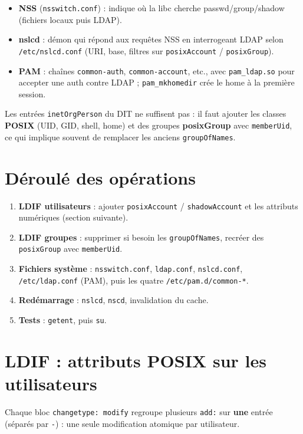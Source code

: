 \documentclass[11pt,a4paper]{report}
\begin{document}
\begin{itemize}[leftmargin=*]
  \item \textbf{NSS} (\texttt{nsswitch.conf}) : indique où la libc cherche passwd/group/shadow (fichiers locaux puis LDAP).
  \item \textbf{nslcd} : démon qui répond aux requêtes NSS en interrogeant LDAP selon \texttt{/etc/nslcd.conf} (URI, base, filtres sur \texttt{posixAccount} / \texttt{posixGroup}).
  \item \textbf{PAM} : chaînes \texttt{common-auth}, \texttt{common-account}, etc., avec \texttt{pam\_ldap.so} pour accepter une auth contre LDAP ; \texttt{pam\_mkhomedir} crée le home à la première session.
\end{itemize}

Les entrées \texttt{inetOrgPerson} du DIT ne suffisent pas : il faut ajouter les classes \textbf{POSIX} (UID, GID, shell, home) et des groupes \textbf{posixGroup} avec \texttt{memberUid}, ce qui implique souvent de remplacer les anciens \texttt{groupOfNames}.

\section{Déroulé des opérations}

\begin{enumerate}[leftmargin=*]
  \item \textbf{LDIF utilisateurs} : ajouter \texttt{posixAccount} / \texttt{shadowAccount} et les attributs numériques (section suivante).
  \item \textbf{LDIF groupes} : supprimer si besoin les \texttt{groupOfNames}, recréer des \texttt{posixGroup} avec \texttt{memberUid}.
  \item \textbf{Fichiers système} : \texttt{nsswitch.conf}, \texttt{ldap.conf}, \texttt{nslcd.conf}, \texttt{/etc/ldap.conf} (PAM), puis les quatre \texttt{/etc/pam.d/common-*}.
  \item \textbf{Redémarrage} : \texttt{nslcd}, \texttt{nscd}, invalidation du cache.
  \item \textbf{Tests} : \texttt{getent}, puis \texttt{su}.
\end{enumerate}

\section{LDIF : attributs POSIX sur les utilisateurs}

Chaque bloc \texttt{changetype: modify} regroupe plusieurs \texttt{add:} sur \textbf{une} entrée (séparés par \texttt{-}) : une seule modification atomique par utilisateur.
\end{document}
